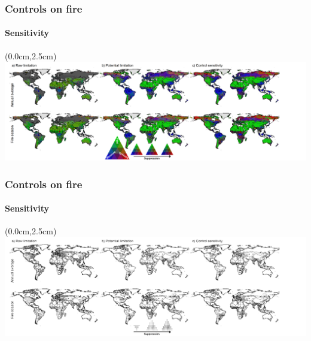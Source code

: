 \begin{frame}
\end{frame}


\addtocounter{framenumber}{-1}




\begin{frame}
	\frametitle{Controls on fire}
	\framesubtitle{Sensitivity}
	\begin{textblock*}{12cm}(0.0cm,2.5cm)
        \includegraphics[width=14cm,trim={0 0 0cm 0}, clip]{images/RawPotSen}	
	\end{textblock*}
\end{frame}

\addtocounter{framenumber}{-1}

\begin{frame}
	\frametitle{Controls on fire}
	\framesubtitle{Sensitivity}
	\begin{textblock*}{12cm}(0.0cm,2.5cm)
        \includegraphics[width=14cm,trim={0 0 0cm 0}, clip]{images/RawPotSen-BW}	
	\end{textblock*}
\end{frame}


